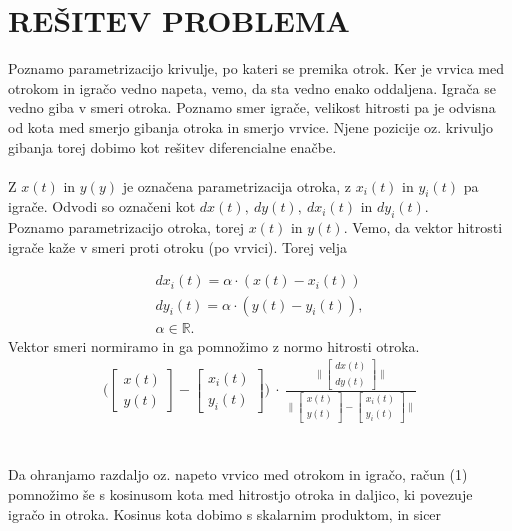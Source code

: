\documentclass[a4paper,12pt]{article}
\begin{document}
\newpage
\section{\textsc{\large{REŠITEV PROBLEMA}}}

Poznamo parametrizacijo krivulje, po kateri se premika otrok. Ker je vrvica med otrokom in 
igračo vedno napeta, vemo, da sta vedno enako oddaljena. Igrača se vedno giba v smeri otroka. 
Poznamo smer igrače, velikost hitrosti pa je odvisna od kota med smerjo gibanja otroka in smerjo vrvice.
Njene pozicije oz. krivuljo gibanja torej dobimo kot rešitev diferencialne enačbe.
\\
\\
Z $x(t)$ in $y(y)$ je označena parametrizacija otroka, z $x_i(t)$ in $y_i(t)$ pa igrače. Odvodi so označeni kot $dx(t), \ dy(t), \ dx_i(t)$ in $dy_i(t)$. \\
Poznamo parametrizacijo otroka, torej $x(t)$ in $y(t)$. Vemo, da vektor hitrosti igrače kaže v smeri proti otroku (po vrvici). Torej velja

\begin{align*}
    dx_i(t) = \alpha \cdot (x(t) - x_i(t)) \\
    dy_i(t) = \alpha \cdot (y(t) - y_i(t)), \\
    \alpha \in \mathbb{R}.
\end{align*}
Vektor smeri normiramo in ga pomnožimo z normo hitrosti otroka.
\\
\begin{align}
     \Big(
    \begin{bmatrix} 
        x(t) \\
        y(t)
    \end{bmatrix}
    -
    \begin{bmatrix} 
        x_i(t) \\
        y_i(t) 
    \end{bmatrix}
    \Big)
    \ \cdot \
    \frac{
    \Big \|
    \begin{bmatrix} 
        dx(t) \\
        dy(t)
    \end{bmatrix}
    \Big \|
    }
    {
    \Big \|
    \begin{bmatrix} 
        x(t) \\
        y(t)
    \end{bmatrix}
    -
    \begin{bmatrix} 
        x_i(t) \\
        y_i(t) 
    \end{bmatrix}
    \Big \|
    }
\end{align}
\\
\\
Da ohranjamo razdaljo oz. napeto vrvico med otrokom in igračo, račun (1) pomnožimo še 
s kosinusom kota med hitrostjo otroka in daljico, ki povezuje igračo in otroka. 
Kosinus kota dobimo s skalarnim produktom, in sicer
\end{document}
